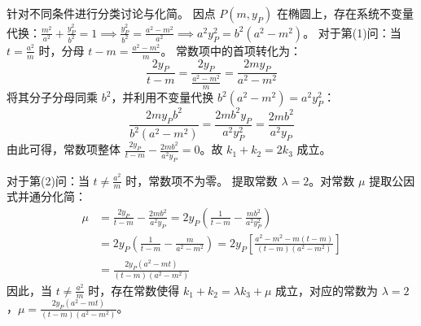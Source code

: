 \begin{solution}
针对不同条件进行分类讨论与化简。
因点 $P(m, y_P)$ 在椭圆上，存在系统不变量代换：$\frac{m^2}{a^2} + \frac{y_P^2}{b^2} = 1 \implies \frac{y_P^2}{b^2} = \frac{a^2-m^2}{a^2} \implies a^2 y_P^2 = b^2(a^2-m^2)$。
对于第(1)问：当 $t = \frac{a^2}{m}$ 时，分母 $t-m = \frac{a^2-m^2}{m}$。
常数项中的首项转化为：
$$ \frac{2y_P}{t-m} = \frac{2y_P}{\frac{a^2-m^2}{m}} = \frac{2m y_P}{a^2-m^2} $$
将其分子分母同乘 $b^2$，并利用不变量代换 $b^2(a^2-m^2) = a^2 y_P^2$：
$$ \frac{2m y_P b^2}{b^2(a^2-m^2)} = \frac{2m b^2 y_P}{a^2 y_P^2} = \frac{2mb^2}{a^2 y_P} $$
由此可得，常数项整体 $\frac{2y_P}{t-m} - \frac{2mb^2}{a^2 y_P} = 0$。故 $k_1 + k_2 = 2k_3$ 成立。

对于第(2)问：当 $t \neq \frac{a^2}{m}$ 时，常数项不为零。
提取常数 $\lambda = 2$。对常数 $\mu$ 提取公因式并通分化简：
\begin{align*}
\mu &= \frac{2y_P}{t-m} - \frac{2mb^2}{a^2 y_P} = 2y_P \left( \frac{1}{t-m} - \frac{m b^2}{a^2 y_P^2} \right) \\
&= 2y_P \left( \frac{1}{t-m} - \frac{m}{a^2-m^2} \right) = 2y_P \left[ \frac{a^2 - m^2 - m(t-m)}{(t-m)(a^2-m^2)} \right] \\
&= \frac{2y_P(a^2 - mt)}{(t-m)(a^2-m^2)}
\end{align*}
因此，当 $t \neq \frac{a^2}{m}$ 时，存在常数使得 $k_1 + k_2 = \lambda k_3 + \mu$ 成立，对应的常数为 $\lambda = 2$，$\mu = \frac{2y_P(a^2 - mt)}{(t-m)(a^2-m^2)}$。
\end{solution}

